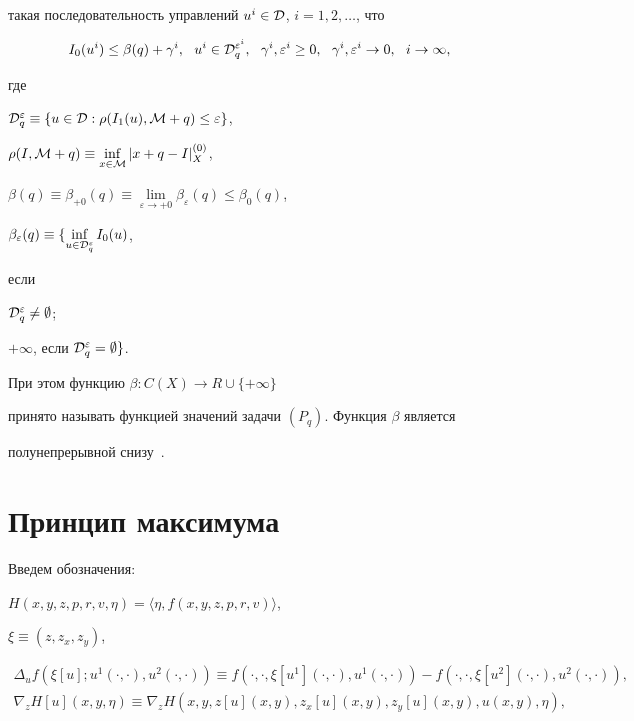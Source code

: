 такая последовательность управлений $u^i\in{\cal D}$, $i=1,2,\dotsc$, что


\begin{equation}\label{mas}


I_0(u^i)\leq\beta(q)+\gamma^i,\ \  u^i\in {\cal D}^{\varepsilon^i}_q,\ \  


\gamma^i,\varepsilon^i\geq 0,\ \  \gamma^i,\varepsilon^i\to 0,  


\ \ i\to\infty,


\end{equation}


где


${\cal D}^\varepsilon_q


\equiv\{u\in {\cal D} : \rho(I_1(u), {\cal M}+q)\leq\varepsilon\}$,


$\rho(I, {\cal M}+q)\equiv\inf\limits_{x\in {\cal M}}|x+q-I|^{(0)}_X$,


$\beta(q)\equiv\beta_{+0}(q)\equiv\lim\limits_{\varepsilon\to+0}


\beta_\varepsilon(q)\leq\beta_0(q)$, 


$\beta_\varepsilon(q)\equiv\{\inf\limits_{u\in {\cal D}^\varepsilon_q}I_0(u)$,


если


${\cal D}^\varepsilon_q\ne\emptyset$; 


$+\infty$, если ${\cal D}^\varepsilon_q=\emptyset\}$.


При этом функцию $\beta : C(X)\to R\cup\{+\infty\}$


принято называть функцией значений задачи $(P_q)$. Функция $\beta$ является


полунепрерывной снизу~\cite{sumin00c}.








\section{Принцип максимума}\label{outlook}





Введем обозначения:


$H(x,y,z,p,r,v,\eta)=\langle\eta, f(x,y,z,p,r,v)\rangle$,


$\xi\equiv(z, z_x, z_y)$,


\begin{gather*}


\Delta_uf(\xi[u]; u^1(\cdot,\cdot),u^2(\cdot,\cdot))\equiv


f(\cdot,\cdot,\xi[u^1](\cdot,\cdot), u^1(\cdot,\cdot))-


f(\cdot,\cdot,\xi[u^2](\cdot,\cdot),u^2(\cdot,\cdot)),\\


%


\nabla_zH[u](x, y, \eta)\equiv\nabla_zH


(x, y,z[u](x, y), z_x[u](x, y), z_y[u](x, y), u(x, y), \eta),


\end{gather*}



